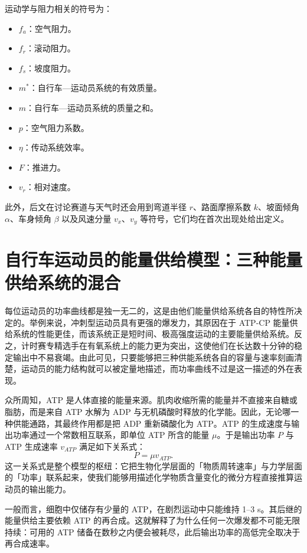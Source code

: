 \documentclass[11pt,a4paper]{ctexart}
\begin{document}
运动学与阻力相关的符号为：
\begin{itemize}
\item $f_a$：空气阻力。
\item $f_r$：滚动阻力。
\item $f_s$：坡度阻力。
\item $m^{*}$：自行车—运动员系统的有效质量。
\item $m$：自行车—运动员系统的质量之和。
\item $p$：空气阻力系数。
\item $\eta$：传动系统效率。
\item $F$：推进力。
\item $v_r$：相对速度。
\end{itemize}

此外，后文在讨论赛道与天气时还会用到弯道半径 $r$、路面摩擦系数 $k$、坡面倾角 $\alpha$、车身倾角 $\beta$ 以及风速分量 $v_x$、$v_y$ 等符号，它们均在首次出现处给出定义。

\section{自行车运动员的能量供给模型：三种能量供给系统的混合}

每位运动员的功率曲线都是独一无二的，这是由他们能量供给系统各自的特性所决定的。举例来说，冲刺型运动员具有更强的爆发力，其原因在于 ATP-CP 能量供给系统的性能更佳，而该系统正是短时间、极高强度运动的主要能量供给系统。反之，计时赛专精选手在有氧系统上的能力更为突出，这使他们在长达数十分钟的稳定输出中不易衰竭。由此可见，只要能够把三种供能系统各自的容量与速率刻画清楚，运动员的能力结构就可以被定量地描述，而功率曲线不过是这一描述的外在表现。

众所周知，ATP 是人体直接的能量来源。肌肉收缩所需的能量并不直接来自糖或脂肪，而是来自 ATP 水解为 ADP 与无机磷酸时释放的化学能。因此，无论哪一种供能通路，其最终作用都是把 ADP 重新磷酸化为 ATP。ATP 的生成速度与输出功率通过一个常数相互联系，即单位 ATP 所含的能量 $\mu$。于是输出功率 $P$ 与 ATP 生成速率 $v_{ATP}$ 满足如下关系式：
\begin{equation}
P=\mu v_{ATP}.
\end{equation}
这一关系式是整个模型的枢纽：它把生物化学层面的「物质周转速率」与力学层面的「功率」联系起来，使我们能够用描述化学物质含量变化的微分方程直接推算运动员的输出能力。

一般而言，细胞中仅储存有少量的 ATP，在剧烈运动中只能维持 1--3 s。其后继的能量供给主要依赖 ATP 的再合成。这就解释了为什么任何一次爆发都不可能无限持续：可用的 ATP 储备在数秒之内便会被耗尽，此后输出功率的高低完全取决于再合成速率。
\end{document}
